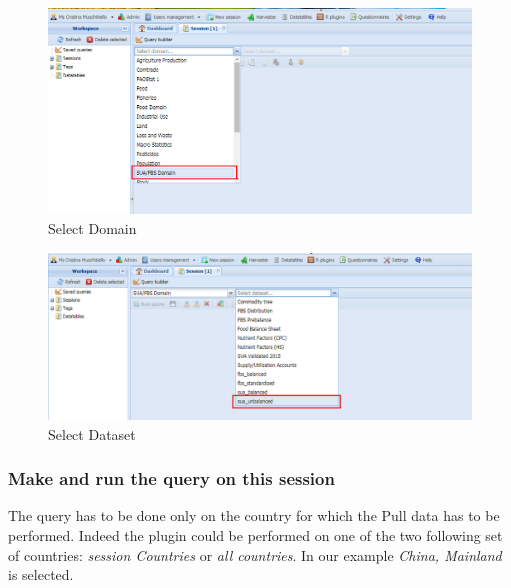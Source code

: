 \documentclass[]{article}
\begin{document}
\begin{figure}[H]

{\centering \includegraphics[width=1\linewidth]{images/standPlugin/04_domain} 

}

\caption{\label{fig:f4}Select Domain}\label{fig:f4}
\end{figure}

\begin{figure}[H]

{\centering \includegraphics[width=1\linewidth]{images/standPlugin/05_dataset} 

}

\caption{\label{fig:f5}Select Dataset}\label{fig:f5}
\end{figure}

\subsubsection{Make and run the query on this
session}\label{make-and-run-the-query-on-this-session}

The query has to be done only on the country for which the Pull data has
to be performed. Indeed the plugin could be performed on one of the two
following set of countries: \emph{session Countries} or \emph{all
countries}. In our example \emph{China, Mainland} is selected.
\end{document}
